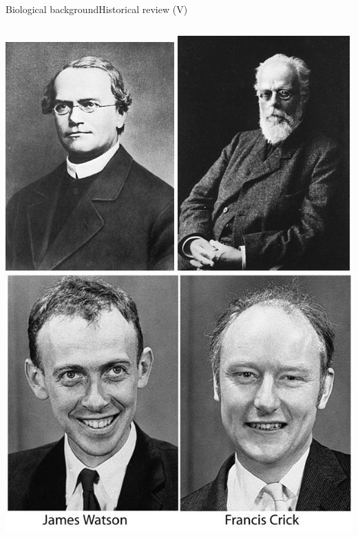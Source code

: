 \documentclass[10pt,compress]{beamer} %
\begin{document}
\begin{frame}{Biological background}{Historical review (V)}
\begin{columns}
		\centering\includegraphics[width=0.5\linewidth]{figs/mendel.jpg}
		\centering\includegraphics[width=0.5\linewidth]{figs/weismann.jpg}\\
		\centering\includegraphics[width=\linewidth]{figs/WatsonCrick.jpg}
	\end{columns}
\end{frame}
\end{document}
